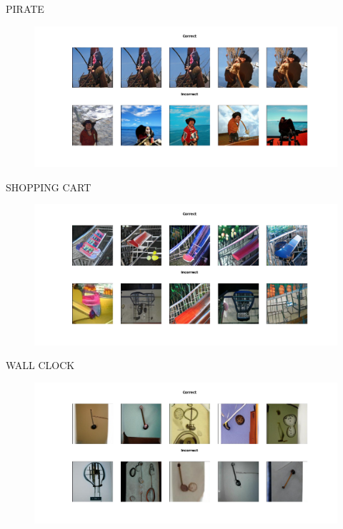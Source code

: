 \documentclass[12pt,a4paper,openany]{book}
\begin{document}
\newline
PIRATE
\begin{figure}[ht!]
    \centering
    \includegraphics[scale=0.4]{figs/imagenet_examples/pirate.png}
\end{figure}
\newpage
\noindent SHOPPING CART
\begin{figure}[ht!]
    \centering
    \includegraphics[scale=0.4]{figs/imagenet_examples/shopping cart.png}
\end{figure}
\newline
WALL CLOCK
\begin{figure}[ht!]
    \centering
    \includegraphics[scale=0.4]{figs/imagenet_examples/wall clock.png}
\end{figure}
\end{document}
